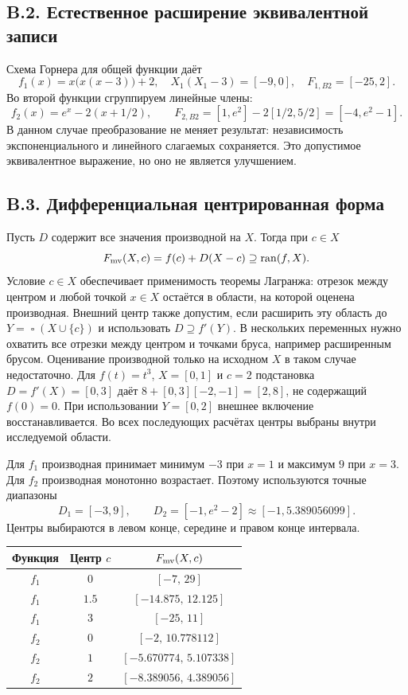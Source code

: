 \documentclass[12pt,a4paper]{article}
\newcommand{\ran}{\operatorname{ran}}
\newcommand{\hull}{\mathop{\square}}
\begin{document}
\subsection*{B.2. Естественное расширение эквивалентной записи}
Схема Горнера для общей функции даёт
\[
f_1(x)=x\bigl(x(x-3)\bigr)+2,
\quad X_1(X_1-3)=[-9,0],\quad F_{1,B2}=[-25,2].
\]
Во второй функции сгруппируем линейные члены:
\[
f_2(x)=e^x-2(x+1/2),\qquad
F_{2,B2}=[1,e^2]-2[1/2,5/2]=[-4,e^2-1].
\]
В данном случае преобразование не меняет результат: независимость
экспоненциального и линейного слагаемых сохраняется.
Это допустимое эквивалентное выражение, но оно не является улучшением.

\subsection*{B.3. Дифференциальная центрированная форма}
Пусть $D$ содержит все значения производной на $X$. Тогда при $c\in X$
\begin{equation}\label{eq:mv}
F_{\rm mv}(X,c)=f(c)+D(X-c)\supseteq\ran(f,X).
\end{equation}
Условие $c\in X$ обеспечивает применимость теоремы Лагранжа:
отрезок между центром и любой точкой $x\in X$ остаётся в области,
на которой оценена производная. Внешний центр также допустим,
если расширить эту область до $Y=\hull(X\cup\{c\})$ и использовать
$D\supseteq f'(Y)$. В нескольких переменных нужно охватить
все отрезки между центром и точками бруса, например расширенным брусом.
Оценивание производной только на исходном $X$ в таком случае
недостаточно. Для $f(t)=t^3$, $X=[0,1]$ и $c=2$ подстановка
$D=f'(X)=[0,3]$ даёт $8+[0,3][-2,-1]=[2,8]$,
не содержащий $f(0)=0$. При использовании $Y=[0,2]$
внешнее включение восстанавливается. Во всех последующих расчётах
центры выбраны внутри исследуемой области.

Для $f_1$ производная принимает минимум $-3$ при $x=1$ и максимум
$9$ при $x=3$. Для $f_2$ производная монотонно возрастает. Поэтому
используются точные диапазоны
\[
D_1=[-3,9],\qquad D_2=[-1,e^2-2]
\approx[-1,5.389056099].
\]
Центры выбираются в левом конце, середине и правом конце интервала.

\begin{center}
{\small
\begin{tabular}{ccc}
\toprule
Функция & Центр $c$ & $F_{\rm mv}(X,c)$\\\midrule
$f_1$ & $0$ & $[-7,\,29]$\\
$f_1$ & $1.5$ & $[-14.875,\,12.125]$\\
$f_1$ & $3$ & $[-25,\,11]$\\
$f_2$ & $0$ & $[-2,\,10.778112]$\\
$f_2$ & $1$ & $[-5.670774,\,5.107338]$\\
$f_2$ & $2$ & $[-8.389056,\,4.389056]$\\
\bottomrule
\end{tabular}}
\end{center}
\end{document}
